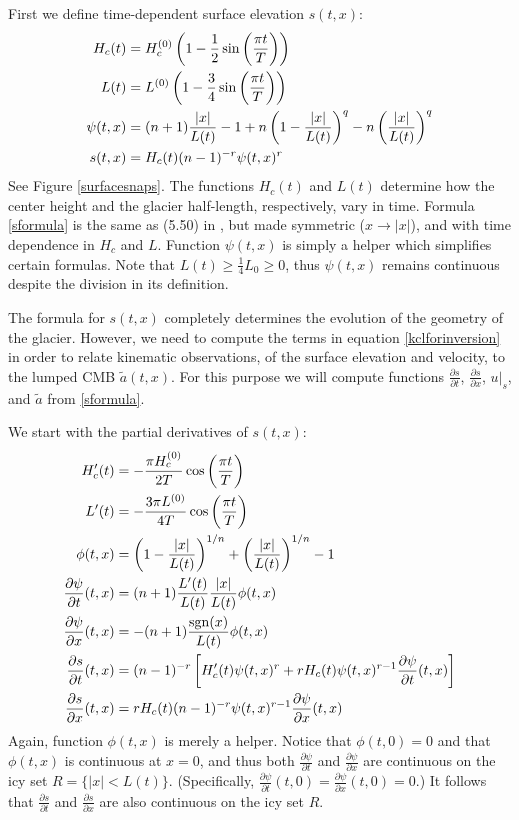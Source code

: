 \documentclass[letterpaper,final,12pt,reqno]{amsart}
\newcommand{\sgn}{\operatorname{sgn}}
\begin{document}
First we define time-dependent surface elevation $s(t,x)$:
\begin{align}
H_c(t) &= H_c^{(0)} \left(1 - \frac{1}{2} \sin\left(\frac{\pi t}{T}\right)\right) \notag \\
L(t) &= L^{(0)} \left(1 - \frac{3}{4} \sin\left(\frac{\pi t}{T}\right)\right) \notag\\
\psi(t,x) &= (n+1) \frac{|x|}{L(t)} - 1 + n \left(1 - \frac{|x|}{L(t)}\right)^q - n \left(\frac{|x|}{L(t)}\right)^q \notag \\
s(t,x) &= H_c(t) (n-1)^{-r} \psi(t,x)^r \label{sformula}
\end{align}
See Figure \ref{surfacesnaps}.  The functions $H_c(t)$ and $L(t)$ determine how the center height and the glacier half-length, respectively, vary in time.  Formula \eqref{sformula} is the same as (5.50) in \cite{vanderVeen2013}, but made symmetric ($x \to |x|$), and with time dependence in $H_c$ and $L$.  Function $\psi(t,x)$ is simply a helper which simplifies certain formulas.  Note that $L(t)\ge \frac{1}{4} L_0 \ge 0$, thus $\psi(t,x)$ remains continuous despite the division in its definition.

The formula for $s(t,x)$ completely determines the evolution of the geometry of the glacier.  However, we need to compute the terms in equation \eqref{kclforinversion} in order to relate kinematic observations, of the surface elevation and velocity, to the lumped CMB $\tilde a(t,x)$.  For this purpose we will compute functions $\frac{\partial s}{\partial t}$, $\frac{\partial s}{\partial x}$, $u|_s$, and $\tilde a$ from \eqref{sformula}.

We start with the partial derivatives of $s(t,x)$:
\begin{align}
H_c'(t) &= - \frac{\pi H_c^{(0)}}{2T} \cos\left(\frac{\pi t}{T}\right) \notag\\
L'(t) &= - \frac{3 \pi L^{(0)}}{4T} \cos\left(\frac{\pi t}{T}\right) \notag \\
\phi(t,x) &= \left(1 - \frac{|x|}{L(t)}\right)^{1/n} + \left(\frac{|x|}{L(t)}\right)^{1/n} - 1 \notag \\
\frac{\partial \psi}{\partial t}(t,x) &= (n+1) \frac{L'(t)}{L(t)} \frac{|x|}{L(t)} \phi(t,x) \notag \\
\frac{\partial \psi}{\partial x}(t,x) &= - (n+1) \frac{\sgn(x)}{L(t)} \phi(t,x) \notag \\
\frac{\partial s}{\partial t}(t,x) &= (n-1)^{-r} \left[H_c'(t) \psi(t,x)^r + r H_c(t) \psi(t,x)^{r-1} \frac{\partial \psi}{\partial t}(t,x)\right] \label{dsdtformula} \\
\frac{\partial s}{\partial x}(t,x) &= r H_c(t) (n-1)^{-r} \psi(t,x)^{r-1} \frac{\partial \psi}{\partial x}(t,x) \label{dsdxformula}
\end{align}
Again, function $\phi(t,x)$ is merely a helper.  Notice that $\phi(t,0)=0$ and that $\phi(t,x)$ is continuous at $x=0$, and thus both $\frac{\partial \psi}{\partial t}$ and $\frac{\partial \psi}{\partial x}$ are continuous on the icy set $R = \{|x|<L(t)\}$.  (Specifically, $\frac{\partial \psi}{\partial t}(t,0)=\frac{\partial \psi}{\partial x}(t,0)=0$.)  It follows that $\frac{\partial s}{\partial t}$ and $\frac{\partial s}{\partial x}$ are also continuous on the icy set $R$.
\end{document}
